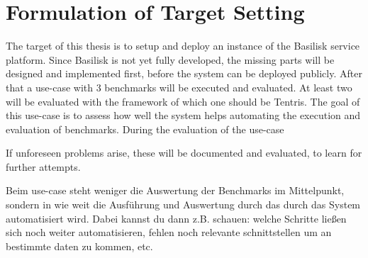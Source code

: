 \chapter{Formulation of Target Setting}
\label{ch:target_setting}

The target of this thesis is to setup and deploy an instance of the Basilisk service platform.
Since Basilisk is not yet fully developed, the missing parts will be designed and implemented first, before the system can be deployed publicly.
After that a use-case with 3 benchmarks will be executed and evaluated.
At least two \tsp{} will be evaluated with the framework of which one should be Tentris\cite{tentris}.
The goal of this use-case is to assess how well the system helps automating the execution and evaluation of benchmarks.
During the evaluation of the use-case

If unforeseen problems arise, these will be documented and evaluated, to learn for further attempts.


Beim use-case steht weniger die Auswertung der Benchmarks im Mittelpunkt, sondern in wie weit die Ausführung und Auswertung durch das durch das System automatisiert wird. 
Dabei kannst du dann z.B. schauen: welche Schritte ließen sich noch weiter automatisieren, fehlen noch relevante schnittstellen um an bestimmte daten zu kommen, etc.



%
%
%

